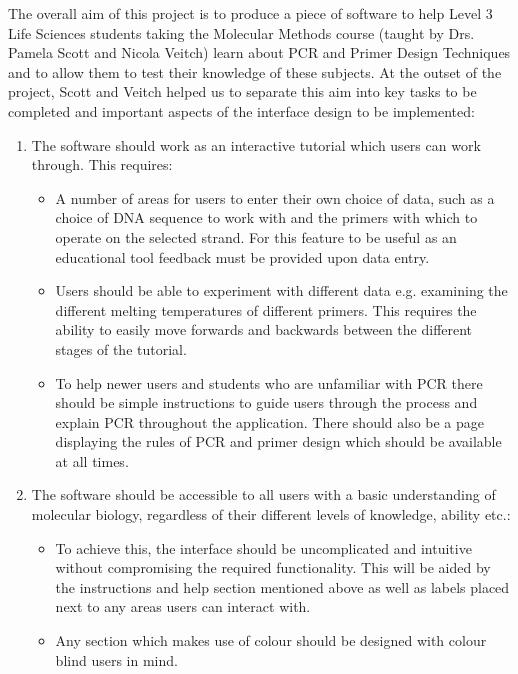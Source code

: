 The overall aim of this project is to produce a piece of software to
help Level 3 Life Sciences students taking the Molecular Methods
course (taught by Drs. Pamela Scott and Nicola Veitch) learn about PCR
and Primer Design Techniques and to allow them to test their knowledge
of these subjects. At the outset of the project, Scott and Veitch
helped us to separate this aim into key tasks to be completed and
important aspects of the interface design to be implemented:

\begin {enumerate}

\item The software should work as an interactive tutorial which users
  can work through. This requires:

\begin {itemize}
\item A number of areas for users to enter their own choice of data,
  such as a choice of DNA sequence to work with and the primers with
  which to operate on the selected strand. For this feature to be
  useful as an educational tool feedback must be provided upon data
  entry.
\item Users should be able to experiment with different data
  e.g. examining the different melting temperatures of different
  primers. This requires the ability to easily move forwards and
  backwards between the different stages of the tutorial.
\item To help newer users and students who are unfamiliar with PCR
  there should be simple instructions to guide users through the
  process and explain PCR throughout the application. There should
  also be a page displaying the rules of PCR and primer design which
  should be available at all times.
\end {itemize}

\item The software should be accessible to all users with a basic
  understanding of molecular biology, regardless of their different
  levels of knowledge, ability etc.:

\begin {itemize}
\item To achieve this, the interface should be uncomplicated and
  intuitive without compromising the required functionality. This will
  be aided by the instructions and help section mentioned above as
  well as labels placed next to any areas users can interact with.
\item Any section which makes use of colour should be designed with
  colour blind users in mind.
\end {itemize}


\end{enumerate}
